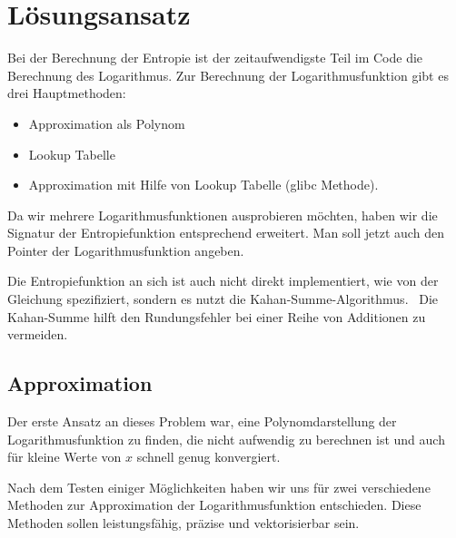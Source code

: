 \section{Lösungsansatz}
Bei der Berechnung der Entropie ist der zeitaufwendigste Teil im Code die Berechnung des Logarithmus.
Zur Berechnung der Logarithmusfunktion gibt es drei Hauptmethoden:
\begin{itemize}
    \item Approximation als Polynom
    \item Lookup Tabelle
    \item Approximation mit Hilfe von Lookup Tabelle (glibc Methode).
\end{itemize} 

Da wir mehrere Logarithmusfunktionen ausprobieren möchten, haben wir die Signatur der Entropiefunktion entsprechend erweitert. Man soll jetzt auch den Pointer der Logarithmusfunktion angeben.

Die Entropiefunktion an sich ist auch nicht direkt implementiert, wie von der Gleichung spezifiziert, sondern es nutzt die Kahan-Summe-Algorithmus.~\cite{kahan} Die Kahan-Summe hilft den Rundungsfehler bei einer Reihe von Additionen zu vermeiden.

\subsection{Approximation}
Der erste Ansatz an dieses Problem war, eine Polynomdarstellung der Logarithmusfunktion zu finden, die nicht aufwendig zu berechnen ist und auch für kleine Werte von $x$ schnell genug konvergiert.

Nach dem Testen einiger Möglichkeiten haben wir uns für zwei verschiedene Methoden zur Approximation der Logarithmusfunktion entschieden. Diese Methoden sollen leistungsfähig, präzise und vektorisierbar sein.

